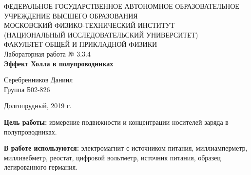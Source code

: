 \documentclass[a4paper,12pt]{article} %
\begin{document}
\begin{center}
	\footnotesize{ФЕДЕРАЛЬНОЕ ГОСУДАРСТВЕННОЕ АВТОНОМНОЕ ОБРАЗОВАТЕЛЬНОЕ 			УЧРЕЖДЕНИЕ ВЫСШЕГО ОБРАЗОВАНИЯ}\\
	\footnotesize{МОСКОВСКИЙ ФИЗИКО-ТЕХНИЧЕСКИЙ ИНСТИТУТ\\(НАЦИОНАЛЬНЫЙ 			ИССЛЕДОВАТЕЛЬСКИЙ УНИВЕРСИТЕТ)}\\
	\footnotesize{ФАКУЛЬТЕТ ОБЩЕЙ И ПРИКЛАДНОЙ ФИЗИКИ\\}
	\hfill \break
	\hfill\break
	\hfill\break
	\hfill \break
	\hfill \break
	\hfill \break
	\hfill \break
	\hfill \break
	\hfill \break
	\hfill \break
	\hfill \break
	\hfill \break
	\hfill \break
	\hfill \break
	\large{Лабораторная работа № 3.3.4\\\textbf{Эффект Холла в полупроводниках}}\\
	\hfill \break
	\hfill \break
	\hfill \break
	\begin{flushright}
		Серебренников Даниил\\
		Группа Б02-826
	\end{flushright}
	\hfill \break
	\hfill \break
	\hfill \break
	\hfill \break
	\hfill \break
\end{center}
\hfill \break
\hfill \break
\hfill \break
\hfill \break
\hfill \break
\hfill \break
\begin{center}
	Долгопрудный, 2019 г.
\end{center}
\thispagestyle{empty}
\newpage

\textbf{Цель работы:} измерение подвижности и концентрации носителей заряда в полупроводниках.

\textbf{В работе используются:} электромагнит с источником питания, миллиамперметр, милливебметр, реостат, цифровой вольтметр, источник питания, образец легированного германия.
\end{document}
